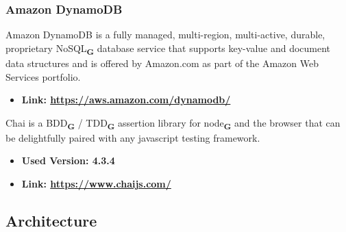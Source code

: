 \subsubsection{Amazon DynamoDB}
Amazon DynamoDB is a fully managed, multi-region, multi-active, durable, proprietary NoSQL\textsubscript{\textbf{G}} database service that supports key-value
and document data structures and is offered by Amazon.com as part of the Amazon Web Services
portfolio.
\begin{itemize}
    \item \textbf{Link: \url{https://aws.amazon.com/dynamodb/}}
\end{itemize}
Chai is a BDD\textsubscript{\textbf{G}} / TDD\textsubscript{\textbf{G}} assertion library for node\textsubscript{\textbf{G}} and the browser that can be delightfully paired with any javascript testing framework.
\begin{itemize}
    \item \textbf{Used Version: 4.3.4}
    \item \textbf{Link: \url{https://www.chaijs.com/}}
\end{itemize}
\subsection{Architecture}
